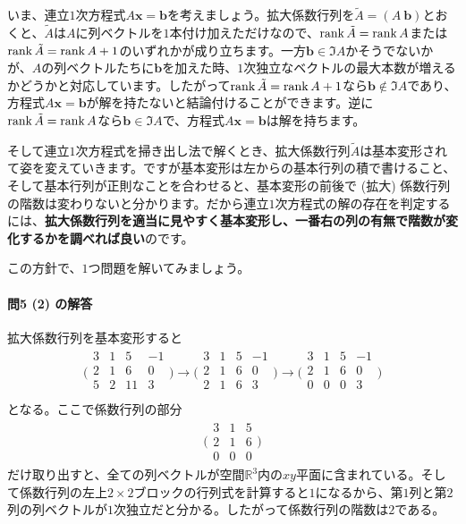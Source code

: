 いま、連立$1$次方程式$A\bm{x} = \bm{b}$を考えましょう。拡大係数行列を$\tilde{A} = ( A \ \bm{b} )$とおくと、$\tilde{A}$は$A$に列ベクトルを$1$本付け加えただけなので、$\operatorname{rank} \tilde{A} = \operatorname{rank} A$または$\operatorname{rank} \tilde{A} = \operatorname{rank} A + 1$のいずれかが成り立ちます。一方$\bm{b} \in \Im A$かそうでないかが、$A$の列ベクトルたちに$\bm{b}$を加えた時、$1$次独立なベクトルの最大本数が増えるかどうかと対応しています。したがって$\operatorname{rank} \tilde{A} = \operatorname{rank} A + 1$なら$\bm{b} \not\in \Im A$であり、方程式$A\bm{x} = \bm{b}$が解を持たないと結論付けることができます。逆に$\operatorname{rank} \tilde{A} = \operatorname{rank} A$なら$\bm{b} \in \Im A$で、方程式$A\bm{x} = \bm{b}$は解を持ちます。

そして連立$1$次方程式を掃き出し法で解くとき、拡大係数行列$\tilde{A}$は基本変形されて姿を変えていきます。ですが基本変形は左からの基本行列の積で書けること、そして基本行列が正則なことを合わせると、基本変形の前後で (拡大) 係数行列の階数は変わりないと分かります。だから連立$1$次方程式の解の存在を判定するには、\textbf{拡大係数行列を適当に見やすく基本変形し、一番右の列の有無で階数が変化するかを調べれば良い}のです。

この方針で、$1$つ問題を解いてみましょう。

\paragraph{問5 (2) の解答} 拡大係数行列を基本変形すると
\begin{align*}
\Biggl(
\begin{array}{rrrr}
3 & 1 & 5 & -1 \\
2 & 1 & 6 & 0 \\
5 & 2 & 11 & 3 \\
\end{array}
\Biggr)
\xrightarrow[]{}
\Biggl(
\begin{array}{rrrr}
3 & 1 & 5 & -1 \\
2 & 1 & 6 & 0 \\
2 & 1 & 6 & 3 \\
\end{array}
\Biggr)
\xrightarrow[]{}
\Biggl(
\begin{array}{rrrr}
3 & 1 & 5 & -1 \\
2 & 1 & 6 & 0 \\
0 & 0 & 0 & 3 \\
\end{array}
\Biggr)
\end{align*}
となる。ここで係数行列の部分
\begin{align*}
\Biggl(
\begin{array}{rrrr}
3 & 1 & 5 \\
2 & 1 & 6 \\
0 & 0 & 0
\end{array}
\Biggr)
\end{align*}
だけ取り出すと、全ての列ベクトルが空間$\mathbb{R}^3$内の$xy$平面に含まれている。そして係数行列の左上$2\times 2$ブロックの行列式を計算すると$1$になるから、第$1$列と第$2$列の列ベクトルが$1$次独立だと分かる。したがって係数行列の階数は$2$である。


